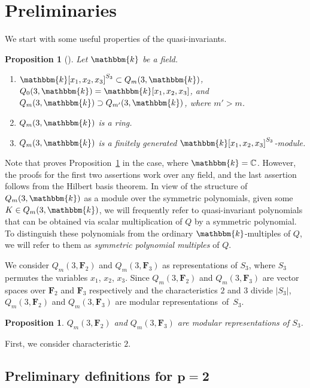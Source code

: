 \documentclass[11pt]{article}
\numberwithin{equation}{section}
\newtheorem{Proposition}[Theorem]{Proposition}
\theoremstyle{definition}
\numberwithin{equation}{section}
\renewcommand{\k}{\mathbbm{k}}
\newcommand{\C}{\mathbb{C}}
\begin{document}
\section{Preliminaries}\label{prelim}
We start with some useful properties of the quasi-invariants.
\begin{Proposition}[\cite{etingof2002lectures}]\label{firstProp}
 Let $\k$ be a field.
\begin{enumerate}\itemsep=0pt
 \item[$1$.] $\k[x_1,x_2,x_3]^{S_3}\subset Q_m(3,\k)$, $Q_0(3,\k) = \k[x_1,x_2,x_3]$, and $Q_m(3,\k)\supset Q_{m'}(3,\k)$, where ${m'>m}$.
 \item[$2$.] $Q_m(3,\k)$ is a ring.
 \item[$3$.] $Q_m(3,\k)$ is a finitely generated $\k[x_1,x_2,x_3]^{S_3}$-module.
\end{enumerate}
\end{Proposition}

Note that \cite{etingof2002lectures} proves Proposition~\ref{firstProp} in the case, where $\k=\C$. However, the proofs for the first two assertions work over any field, and the last assertion follows from the Hilbert basis theorem. In view of the structure of $Q_m(3,\k)$ as a module over the symmetric polynomials, given some $K\in Q_m(3,\k)$, we will frequently refer to quasi-invariant polynomials that can be obtained via scalar multiplication of $Q$ by a symmetric polynomial. To distinguish these polynomials from the ordinary $\k$-multiples of $Q$, we will refer to them as \emph{symmetric polynomial multiples} of $Q$.

We consider $Q_m(3, \mathbf{F}_{2})$ and $Q_m(3, \mathbf{F}_{3})$ as representations of $S_3$, where $S_3$ permutes the variables $x_1$, $x_2$, $x_3$. Since $Q_m(3, \mathbf{F}_{2})$ and $Q_m(3, \mathbf{F}_{3})$ are vector spaces over $\mathbf{F}_2$ and $\mathbf{F}_3$ respectively and the characteristics $2$ and $3$ divide $|S_3|$, $Q_m(3, \mathbf{F}_{2})$ and $Q_m(3, \mathbf{F}_{3})$ are modular representations~of~$S_3$.

\begin{Proposition}
 $Q_m(3, \mathbf{F}_{2})$ and $Q_m(3, \mathbf{F}_{3})$ are modular representations of $S_3$.
\end{Proposition}

First, we consider characteristic $2$.

\subsection[Preliminary definitions for p=2]{Preliminary definitions for $\boldsymbol{p=2}$}
\end{document}
